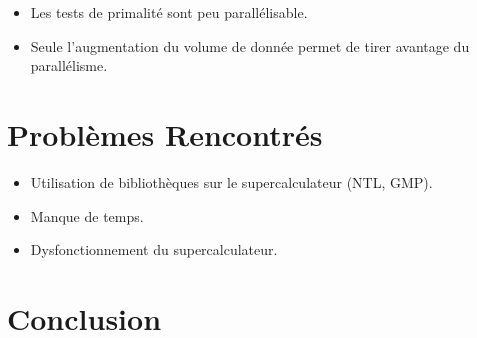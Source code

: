 \begin{frame}
\begin{itemize}
\item Les tests de primalité sont peu parallélisable. \vspace{2em}
\item Seule l'augmentation du volume de donnée permet de tirer avantage du parallélisme. \vspace{2em}
\end{itemize}
\end{frame}
	
	\section{Problèmes Rencontrés}
	\begin{frame}
\begin{itemize}
\item Utilisation de bibliothèques sur le supercalculateur (NTL, GMP).\vspace{2em}
\item Manque de temps. \vspace{2em}
\item Dysfonctionnement  du supercalculateur.
\end{itemize}
	\end{frame}
	
	\section{Conclusion}
	\begin{frame}
	
	\end{frame}


